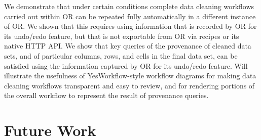 \documentclass[sigconf,screen,nonacm]{acmart}
\begin{document}
We demonstrate that under certain conditions complete data cleaning workflows carried out within OR can be repeated fully automatically in a different instance of OR.  We shown that this requires using information that is recorded by OR for its undo/redo feature, but that is not exportable from OR via recipes or its native HTTP API.
We show that key queries of the provenance of cleaned data sets, and of particular columns, rows, and cells in the final data set, can be satisfied using the information captured by OR for its undo/redo feature.
Will illustrate the usefulness of YesWorkflow-style workflow diagrams for making data cleaning workflows transparent and easy to review, and for rendering portions of the overall workflow to represent the result of provenance queries.

\section{Future Work}



%


\end{document}
